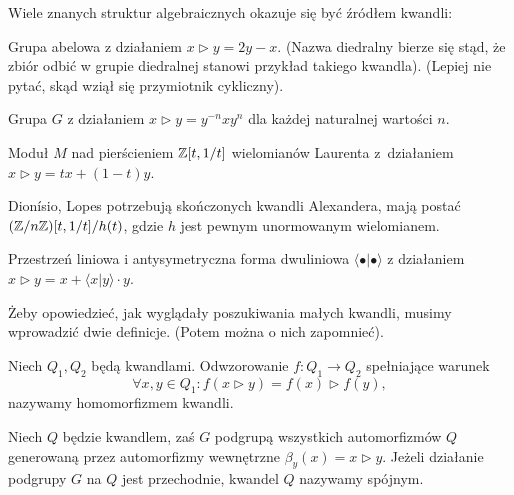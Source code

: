 Wiele znanych struktur algebraicznych okazuje się być źródłem kwandli:

\begin{example}
%
%
    Grupa abelowa z działaniem $x \triangleright y = 2y - x$.
    (Nazwa diedralny bierze się stąd, że zbiór odbić w grupie diedralnej stanowi przykład takiego kwandla).
    (Lepiej nie pytać, skąd wziął się przymiotnik cykliczny).
\end{example}

\begin{example}
%
    Grupa $G$ z działaniem $x \triangleright y = y^{-n} x y^n$ dla każdej naturalnej wartości $n$.
\end{example}

\begin{example}
%
    Moduł $M$ nad pierścieniem $\mathbb Z[t, 1/t]$ wielomianów Laurenta z~działaniem $x \triangleright y = tx + (1-t) y$.
\end{example}

Dionísio, Lopes \cite[s. 1043]{lopes2003} potrzebują skończonych kwandli Alexandera, mają postać $(\mathbb Z/n\mathbb Z)[t, 1/t] / h(t)$, gdzie $h$ jest pewnym unormowanym wielomianem.

\begin{example}
%
    Przestrzeń liniowa i antysymetryczna forma dwuliniowa $\langle \bullet | \bullet \rangle$ z działaniem $x \triangleright y = x + \langle x | y \rangle \cdot y$.
\end{example}

Żeby opowiedzieć, jak wyglądały poszukiwania małych kwandli, musimy wprowadzić dwie definicje.
(Potem można o nich zapomnieć).

\begin{definition}
    Niech $Q_1, Q_2$ będą kwandlami.
    Odwzorowanie $f \colon Q_1 \to Q_2$ spełniające warunek
    \begin{equation}
        \forall x, y \in Q_1 : f(x \triangleright y) = f(x) \triangleright f(y),
    \end{equation}
    nazywamy homomorfizmem kwandli.
\end{definition}

\begin{definition}
%
    Niech $Q$ będzie kwandlem, zaś $G$ podgrupą wszystkich automorfizmów $Q$ generowaną przez automorfizmy wewnętrzne $\beta_y(x) = x \triangleright y$.
    Jeżeli działanie podgrupy $G$ na $Q$ jest przechodnie, kwandel $Q$ nazywamy spójnym.
\end{definition}


